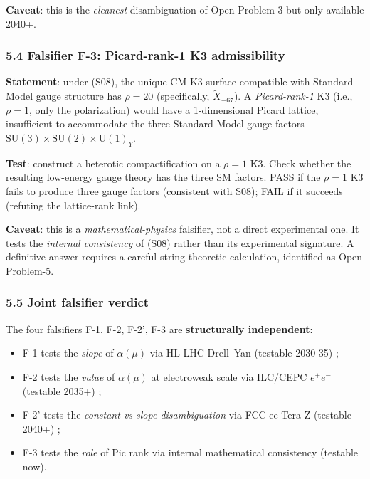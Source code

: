 \documentclass[
  11pt,
  a4paper,
]{article}
\providecommand{\tightlist}{\setlength{\itemsep}{0pt}\setlength{\parskip}{0pt}}
\providecommand{\tightlist}{%
  \setlength{\itemsep}{0pt}\setlength{\parskip}{0pt}}
\begin{document}
\textbf{Caveat}: this is the \emph{cleanest} disambiguation of Open Problem-3 but only available 2040+.

\hypertarget{falsifier-f-3-picard-rank-1-k3-admissibility}{%
\subsubsection{5.4 Falsifier F-3: Picard-rank-1 K3 admissibility}\label{falsifier-f-3-picard-rank-1-k3-admissibility}}

\textbf{Statement}: under (S08), the unique CM K3 surface compatible with Standard-Model gauge structure has \(\rho = 20\) (specifically, \(\tilde X_{-67}\)). A \emph{Picard-rank-1} K3 (i.e., \(\rho = 1\), only the polarization) would have a 1-dimensional Picard lattice, insufficient to accommodate the three Standard-Model gauge factors \(\mathrm{SU}(3) \times \mathrm{SU}(2) \times \mathrm{U}(1)_Y\).

\textbf{Test}: construct a heterotic compactification on a \(\rho = 1\) K3. Check whether the resulting low-energy gauge theory has the three SM factors. PASS if the \(\rho = 1\) K3 fails to produce three gauge factors (consistent with S08); FAIL if it succeeds (refuting the lattice-rank link).

\textbf{Caveat}: this is a \emph{mathematical-physics} falsifier, not a direct experimental one. It tests the \emph{internal consistency} of (S08) rather than its experimental signature. A definitive answer requires a careful string-theoretic calculation, identified as Open Problem-5.

\hypertarget{joint-falsifier-verdict}{%
\subsubsection{5.5 Joint falsifier verdict}\label{joint-falsifier-verdict}}

The four falsifiers F-1, F-2, F-2', F-3 are \textbf{structurally independent}:

\begin{itemize}
\tightlist
\item
  F-1 tests the \emph{slope} of \(\alpha(\mu)\) via HL-LHC Drell--Yan (testable 2030-35) ;
\item
  F-2 tests the \emph{value} of \(\alpha(\mu)\) at electroweak scale via ILC/CEPC \(e^+e^-\) (testable 2035+) ;
\item
  F-2' tests the \emph{constant-vs-slope disambiguation} via FCC-ee Tera-Z (testable 2040+) ;
\item
  F-3 tests the \emph{role} of \(\mathrm{Pic}\) rank via internal mathematical consistency (testable now).
\end{itemize}
\end{document}
